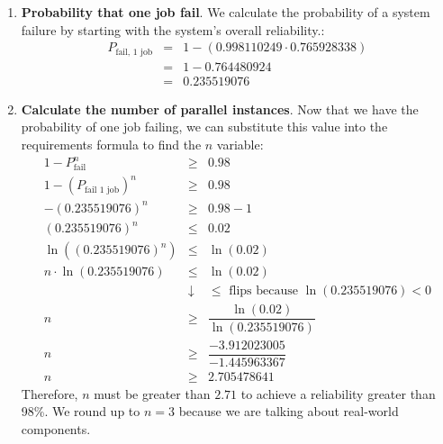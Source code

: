 \begin{enumerate}
\begin{enumerate}
        \item \textbf{Probability that one job fail}. We calculate the probability of a system failure by starting with the system's overall reliability.:
        \begin{equation*}
            \begin{array}{rcl}
                P_{\text{fail, 1 job}} &=& 1 - \left(0.998110249 \cdot 0.765928338\right) \\ [.3em]
                &=& 1 - 0.764480924 \\ [.3em]
                &=& 0.235519076
            \end{array}
        \end{equation*}

        \item \textbf{Calculate the number of parallel instances}. Now that we have the probability of one job failing, we can substitute this value into the requirements formula to find the $n$ variable:
        \begin{equation*}
            \begin{array}{rcl}
                1 - P_{\text{fail}}^n &\ge& 0.98 \\ [.5em]
                1 - \left(P_{\text{fail 1 job}}\right)^{n} &\ge& 0.98 \\ [.5em]
                - \left(0.235519076\right)^{n} &\ge& 0.98 - 1 \\ [.5em]
                \left(0.235519076\right)^{n} &\le& 0.02 \\ [.5em]
                \ln\left(\left(0.235519076\right)^{n}\right) &\le& \ln\left(0.02\right) \\ [.5em]
                n \cdot \ln\left(0.235519076\right) &\le& \ln\left(0.02\right) \\ [.5em]
                &\downarrow& \le \text{ flips because } \ln\left(0.235519076\right) < 0 \\ [.5em]
                n &\ge& \dfrac{
                    \ln\left(0.02\right)
                }{
                    \ln\left(0.235519076\right)
                } \\ [1.3em]
                n &\ge& \dfrac{
                    -3.912023005
                }{
                    -1.445963367
                } \\ [1.3em]
                n &\ge& 2.705478641
            \end{array}
        \end{equation*}
        Therefore, $n$ must be greater than $2.71$ to achieve a reliability greater than 98\%. We round up to $n = 3$ because we are talking about real-world components.
    \end{enumerate}


\end{enumerate}
